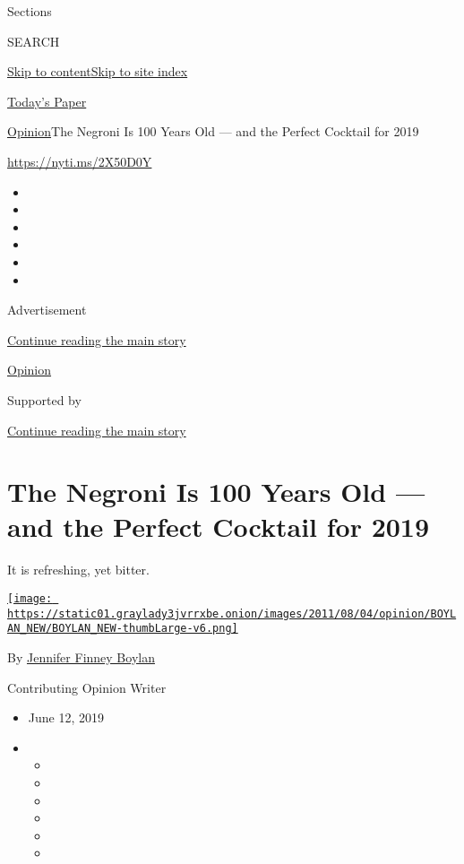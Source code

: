 Sections

SEARCH

\protect\hyperlink{site-content}{Skip to
content}\protect\hyperlink{site-index}{Skip to site index}

\href{https://myaccount.nytimes3xbfgragh.onion/auth/login?response_type=cookie\&client_id=vi}{}

\href{https://www.nytimes3xbfgragh.onion/section/todayspaper}{Today's
Paper}

\href{/section/opinion}{Opinion}\textbar{}The Negroni Is 100 Years Old
--- and the Perfect Cocktail for 2019

\url{https://nyti.ms/2X50D0Y}

\begin{itemize}
\item
\item
\item
\item
\item
\item
\end{itemize}

Advertisement

\protect\hyperlink{after-top}{Continue reading the main story}

\href{/section/opinion}{Opinion}

Supported by

\protect\hyperlink{after-sponsor}{Continue reading the main story}

\hypertarget{the-negroni-is-100-years-old--and-the-perfect-cocktail-for-2019}{%
\section{The Negroni Is 100 Years Old --- and the Perfect Cocktail for
2019}\label{the-negroni-is-100-years-old--and-the-perfect-cocktail-for-2019}}

It is refreshing, yet bitter.

\href{https://topics.nytimes3xbfgragh.onion/top/reference/timestopics/people/b/jennifer_finney_boylan/index.html}{\texttt{[image: https://static01.graylady3jvrrxbe.onion/images/2011/08/04/opinion/BOYLAN\_NEW/BOYLAN\_NEW-thumbLarge-v6.png]}}

By
\href{https://topics.nytimes3xbfgragh.onion/top/reference/timestopics/people/b/jennifer_finney_boylan/index.html}{Jennifer
Finney Boylan}

Contributing Opinion Writer

\begin{itemize}
\item
  June 12, 2019
\item
  \begin{itemize}
  \item
  \item
  \item
  \item
  \item
  \item
  \end{itemize}
\end{itemize}

